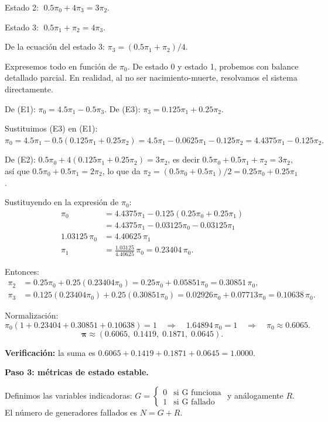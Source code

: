 \documentclass[11pt,a4paper]{article}
\theoremstyle{definition}
\theoremstyle{remark}
\begin{document}
\begin{ejemplo}
Estado 2: $\;0.5\pi_0 + 4\pi_3 = 3\pi_2.$

Estado 3: $\;0.5\pi_1 + \pi_2 = 4\pi_3.$

De la ecuación del estado 3: $\pi_3 = (0.5\pi_1+\pi_2)/4$.

Expresemos todo en función de $\pi_0$.  De estado 0 y estado 1,
probemos con balance detallado parcial.  En realidad, al no ser
nacimiento-muerte, resolvamos el sistema directamente.

De (E1): $\pi_0 = 4.5\pi_1 - 0.5\pi_3$.
De (E3): $\pi_3 = 0.125\pi_1 + 0.25\pi_2$.

Sustituimos (E3) en (E1):
$\pi_0 = 4.5\pi_1 - 0.5(0.125\pi_1+0.25\pi_2)
= 4.5\pi_1 - 0.0625\pi_1 - 0.125\pi_2
= 4.4375\pi_1 - 0.125\pi_2.$

De (E2): $0.5\pi_0 + 4(0.125\pi_1+0.25\pi_2) = 3\pi_2$,
es decir $0.5\pi_0 + 0.5\pi_1 + \pi_2 = 3\pi_2$,
así que $0.5\pi_0 + 0.5\pi_1 = 2\pi_2$, lo que da
$\pi_2 = (0.5\pi_0+0.5\pi_1)/2 = 0.25\pi_0+0.25\pi_1$.

Sustituyendo en la expresión de $\pi_0$:
\begin{align*}
  \pi_0 &= 4.4375\pi_1 - 0.125(0.25\pi_0+0.25\pi_1) \\
  &= 4.4375\pi_1 - 0.03125\pi_0 - 0.03125\pi_1 \\
  1.03125\,\pi_0 &= 4.40625\,\pi_1 \\
  \pi_1 &= \frac{1.03125}{4.40625}\,\pi_0 = 0.23404\,\pi_0.
\end{align*}

Entonces:
\begin{align*}
  \pi_2 &= 0.25\pi_0 + 0.25(0.23404\pi_0) = 0.25\pi_0+0.05851\pi_0
  = 0.30851\,\pi_0, \\
  \pi_3 &= 0.125(0.23404\pi_0)+0.25(0.30851\pi_0)
  = 0.02926\pi_0 + 0.07713\pi_0 = 0.10638\,\pi_0.
\end{align*}

Normalización:
\[
  \pi_0(1+0.23404+0.30851+0.10638) = 1
  \quad\Longrightarrow\quad
  1.64894\,\pi_0 = 1
  \quad\Longrightarrow\quad
  \pi_0 \approx 0.6065.
\]
\[
  \boldsymbol{\pi} \approx (0.6065,\;0.1419,\;0.1871,\;0.0645).
\]

\textbf{Verificación:} la suma es $0.6065+0.1419+0.1871+0.0645=1.0000$. \checkmark

\textbf{Paso 3: métricas de estado estable.}

Definimos las variables indicadoras:
$G = \begin{cases}0&\text{si G funciona}\\1&\text{si G fallado}\end{cases}$
y análogamente $R$.  El número de generadores fallados es $N=G+R$.


\end{ejemplo}
\end{document}

